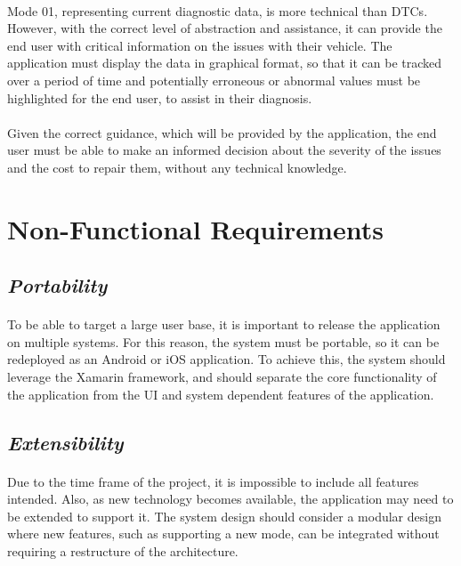 	\paragraph{}{
	Mode 01, representing current diagnostic data, is more technical than DTCs. However, with the correct level of abstraction and assistance, it can provide the end user with critical information on the issues with their vehicle. The application must display the data in graphical format, so that it can be tracked over a period of time and potentially erroneous or abnormal values must be highlighted for the end user, to assist in their diagnosis.
	}
	\paragraph{}{
	Given the correct guidance, which will be provided by the application, the end user must be able to make an informed decision about the severity of the issues and the cost to repair them, without any technical knowledge.
	}

\section{Non-Functional Requirements}
	\subsection*{\textit{Portability}}
		\paragraph{}{
		To be able to target a large user base, it is important to release the application on multiple systems. For this reason, the system must be portable, so it can be redeployed as an Android or iOS application. To achieve this, the system should leverage the Xamarin framework, and should separate the core functionality of the application from the UI and system dependent features of the application.
		}
	\subsection*{\textit{Extensibility}}
		\paragraph{}{
		Due to the time frame of the project, it is impossible to include all features intended. Also, as new technology becomes available, the application may need to be extended to support it. The system design should consider a modular design where new features, such as supporting a new mode, can be integrated without requiring a restructure of the architecture.
		}
